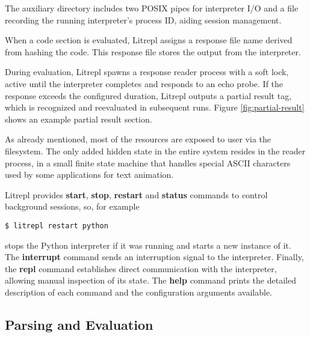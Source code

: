 \documentclass[letterpaper,12pt,twocolumn]{article}
\begin{document}
The auxiliary directory includes two POSIX pipes for interpreter I/O and a file
recording the running interpreter's process ID, aiding session management.

When a code section is evaluated, Litrepl assigns a response file name derived
from hashing the code. This response file stores the output from the
interpreter.

During evaluation, Litrepl spawns a response reader process with a soft lock,
active until the interpreter completes and responds to an echo probe. If the
response exceeds the configured duration, Litrepl outputs a partial result tag,
which is recognized and reevaluated in subsequent runs.  Figure
\ref{fig:partial-result} shows an example partial result section.

As already mentioned, most of the resources are exposed to user via the
filesystem. The only added hidden state in the entire system resides in the
reader process, in a small finite state machine that handles special ASCII
characters used by some applications for text animation.

Litrepl provides \textbf{start}, \textbf{stop}, \textbf{restart} and
\textbf{status} commands to control background sessions, so, for example

\begin{verbatim}
$ litrepl restart python
\end{verbatim}

stops the Python interpreter if it was running and starts a new instance of it.
The \textbf{interrupt} command sends an interruption signal to the interpreter.
Finally, the \textbf{repl} command establishes direct communication with the
interpreter, allowing manual inspection of its state. The \textbf{help} command
prints the detailed description of each command and the configuration
arguments available.

\subsection{Parsing and Evaluation}
\end{document}
